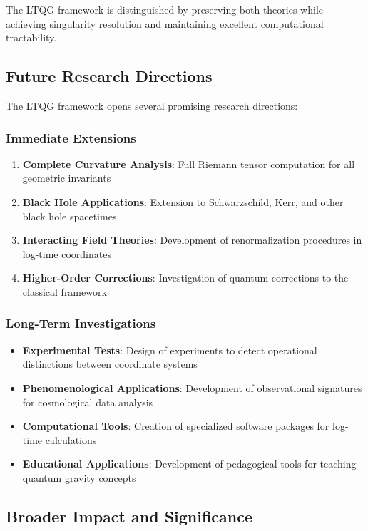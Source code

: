 The LTQG framework is distinguished by preserving both theories while achieving singularity resolution and maintaining excellent computational tractability.

\subsection{Future Research Directions}
\label{subsec:future_directions}

The LTQG framework opens several promising research directions:

\subsubsection{Immediate Extensions}

\begin{enumerate}
\item \textbf{Complete Curvature Analysis}: Full Riemann tensor computation for all geometric invariants
\item \textbf{Black Hole Applications}: Extension to Schwarzschild, Kerr, and other black hole spacetimes
\item \textbf{Interacting Field Theories}: Development of renormalization procedures in log-time coordinates
\item \textbf{Higher-Order Corrections}: Investigation of quantum corrections to the classical framework
\end{enumerate}

\subsubsection{Long-Term Investigations}

\begin{itemize}
\item \textbf{Experimental Tests}: Design of experiments to detect operational distinctions between coordinate systems
\item \textbf{Phenomenological Applications}: Development of observational signatures for cosmological data analysis
\item \textbf{Computational Tools}: Creation of specialized software packages for log-time calculations
\item \textbf{Educational Applications}: Development of pedagogical tools for teaching quantum gravity concepts
\end{itemize}

\subsection{Broader Impact and Significance}
\label{subsec:broader_impact}

